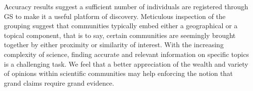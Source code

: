 \documentclass[twocolumn]{bmcart}%
\begin{document}
Accuracy results suggest a sufficient number of individuals are
registered through GS to make it a useful platform of discovery.
Meticulous inspection of the grouping suggest that communities typically
embed either a geographical or a topical component, that is to say,
certain communities are seemingly brought together by either proximity
or similarity of interest. With the increasing complexity of science,
finding accurate and relevant information on specific topics is a
challenging task. We feel that a better appreciation of the wealth and
variety of opinions within scientific communities may help enforcing the
notion that grand claims require grand evidence.

\end{document}
